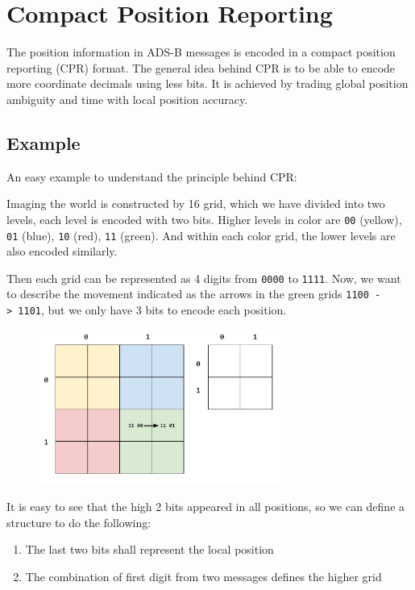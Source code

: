 \section{Compact Position Reporting}\label{compact-position-reporting}

The position information in ADS-B messages is encoded in a compact
position reporting (CPR) format. The general idea behind CPR is to be
able to encode more coordinate decimals using less bits. It is achieved
by trading global position ambiguity and time with local position
accuracy.

\subsection{Example}\label{example}

An easy example to understand the principle behind CPR:

Imaging the world is constructed by 16 grid, which we have divided into
two levels, each level is encoded with two bits. Higher levels in color
are \texttt{00} (yellow), \texttt{01} (blue), \texttt{10} (red),
\texttt{11} (green). And within each color grid, the lower levels are
also encoded similarly.

Then each grid can be represented as 4 digits from \texttt{0000} to
\texttt{1111}. Now, we want to describe the movement indicated as the
arrows in the green grids \texttt{1100\ -\textgreater{}\ 1101}, but we
only have 3 bits to encode each position.

\begin{figure}
  \center
  \includegraphics[width=8cm]{images/illustration-cpr-1.pdf}
\end{figure}

It is easy to see that the high 2 bits appeared in all positions, so we
can define a structure to do the following:

\begin{enumerate}
  \item The last two bits shall represent the local position
  \item The combination of first digit from two messages defines the higher grid
\end{enumerate}

